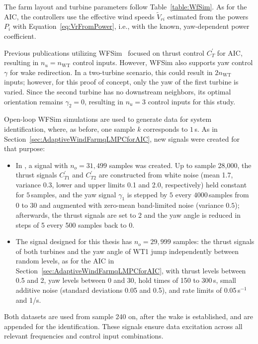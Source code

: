 The farm layout and turbine parameters follow Table~\ref{table:WfSim}. As for the AIC, the controllers use the effective wind speeds $\tilde{V}_{ri}$ estimated from the powers $P_i$ with Equation~\eqref{eq:VrFromPower}, i.e., with the known, yaw-dependent power coefficient.

Previous publications utilizing WFSim~\cite{boersma2017tutorial,doekemeijer2018online, sharan2022Koopman, dittmer2022data} focused on thrust control $C_T^{\prime}$ for AIC, resulting in $n_u = n_{\text{WT}}$ control inputs. However, WFSim also supports yaw control $\gamma$ for wake redirection. In a two-turbine scenario, this could result in $2n_{\text{WT}}$ inputs; however, for this proof of concept, only the yaw of the first turbine is varied. Since the second turbine has no downstream neighbors, its optimal orientation remains $\gamma_2 = 0$\textdegree{}, resulting in $n_u = 3$ control inputs for this study.

Open-loop WFSim simulations are used to generate data for system identification, where, as before, one sample $k$ corresponds to $1$\,s. As in Section~\ref{sec:AdaptiveWindFarmqLMPCforAIC}, new signals were created for that purpose:
\begin{itemize}
    \item In \cite{dittmer2023koopman}, a signal with $n_o = 31,499$ samples was created. Up to sample 28,000, the thrust signals $C_{T1}^{\prime}$ and $C_{T2}^{\prime}$ are constructed from white noise (mean 1.7, variance 0.3, lower and upper limits 0.1 and 2.0, respectively) held constant for $5$\,samples, and the yaw signal $\gamma_1$ is stepped by $5$\textdegree{} every $4000$\,samples from $0$\textdegree{} to $30$\textdegree{} and augmented with zero-mean band-limited noise (variance $0.5$\textdegree{}); afterwards, the thrust signals are set to 2 and the yaw angle is reduced in steps of 5\textdegree{} every 500 samples back to 0\textdegree{}. 
    \item The signal designed for this thesis has $n_o = 29,999$ samples: the thrust signals of both turbines and the yaw angle of WT1 jump independently between random levels, as for the AIC in Section~\ref{sec:AdaptiveWindFarmqLMPCforAIC}, with thrust levels between 0.5 and 2, yaw levels between 0\textdegree{} and 30\textdegree{}, hold times of 150 to 300\,s, small additive noise (standard deviations 0.05 and 0.5\textdegree{}), and rate limits of 0.05\,s$^{-1}$ and 1\textdegree/s.
\end{itemize}
Both datasets are used from sample 240 on, after the wake is established, and are appended for the identification. These signals ensure data excitation across all relevant frequencies and control input combinations.

